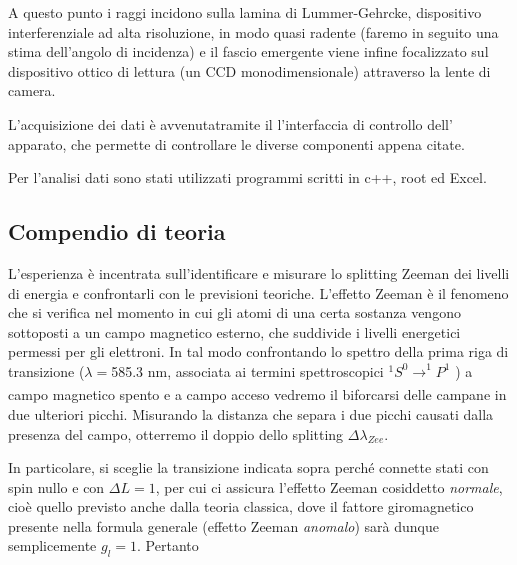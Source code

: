 \documentclass{article}
\begin{document}
A questo punto i raggi incidono sulla lamina di Lummer-Gehrcke, dispositivo
interferenziale ad alta risoluzione, in modo quasi
radente (faremo in seguito una stima dell'angolo di incidenza) e il fascio 
emergente viene infine focalizzato sul dispositivo ottico di lettura (un CCD
monodimensionale) attraverso la lente di camera.


L'acquisizione dei dati è avvenutatramite il l'interfaccia di controllo dell'
apparato, che permette di controllare le diverse componenti appena citate.

Per l'analisi dati sono stati utilizzati programmi scritti in c++, root ed Excel.


\subsection*{Compendio di teoria}

L'esperienza è incentrata sull'identificare e misurare lo splitting 
Zeeman dei livelli di energia e confrontarli con le previsioni teoriche.
L'effetto Zeeman è il fenomeno che si verifica nel momento in cui gli
atomi di una certa sostanza vengono sottoposti a un campo magnetico 
esterno, che suddivide i livelli energetici permessi per gli elettroni.
In tal modo confrontando lo spettro della prima riga di transizione 
($\lambda = $585.3 nm, associata ai termini spettroscopici
$^1S^0 \xrightarrow[]{}  ^1P^1$ ) a campo magnetico spento e a campo 
acceso vedremo 
il biforcarsi delle campane in due ulteriori picchi. Misurando la
distanza che separa i due picchi causati dalla presenza del campo,
otterremo il doppio dello splitting $\Delta\lambda_{Zee} $.

In particolare, si sceglie la transizione indicata sopra perché connette
stati con spin nullo e con $\Delta L = 1$, per cui ci assicura l'effetto
Zeeman cosiddetto \textit{normale}, cioè quello previsto anche dalla 
teoria classica, dove il fattore giromagnetico presente nella formula 
generale (effetto Zeeman \textit{anomalo}) sarà dunque semplicemente
$g_l = 1$. Pertanto
\end{document}
